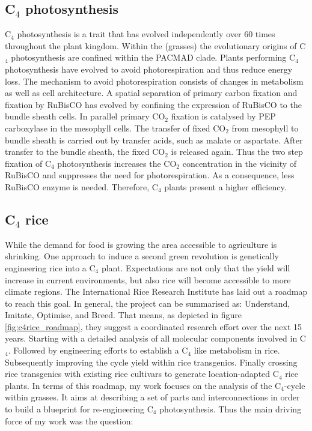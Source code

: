 \subsection{C$_4$ photosynthesis}
C$_4$ photosynthesis is a trait that has evolved independently over 60 times throughout the plant kingdom.
Within the  (grasses) the evolutionary origins of C$_4$ photosynthesis are confined within the PACMAD clade.
Plants performing C$_4$ photosynthesis have evolved to avoid photorespiration and thus reduce energy loss.
The mechanism to avoid photorespiration consists of changes in metabolism as well as cell architecture.
A spatial separation of primary carbon fixation and fixation by \ac{RuBisCO} has evolved by confining the expression of \ac{RuBisCO} to the bundle sheath cells.
In parallel primary CO$_2$ fixation is catalysed by PEP carboxylase in the mesophyll cells.
The transfer of fixed CO$_2$ from mesophyll to bundle sheath is carried out by transfer acids, such as malate or aspartate.
After transfer to the bundle sheath, the fixed CO$_2$ is released again.
Thus the two step fixation of C$_4$ photosynthesis increases the CO$_2$ concentration in the vicinity of \ac{RuBisCO} and suppresses the need for photorespiration.
As a consequence, less \ac{RuBisCO} enzyme is needed.
Therefore, C$_4$ plants present a higher efficiency.
\subsection{C$_4$ rice}
While the demand for food is growing the area accessible to agriculture is shrinking.
One approach to induce a second green revolution is genetically engineering rice into a C$_4$ plant.
Expectations are not only that the yield will increase in current environments, but also rice will become accessible to more climate regions.
The International Rice Research Institute has laid out a roadmap to reach this goal.
In general, the project can be summarised as: Understand, Imitate, Optimise, and Breed.
That means, as depicted in figure \ref{fig:c4rice_roadmap}, they suggest a coordinated research effort over the next 15 years.
Starting with a detailed analysis of all molecular components involved in C$_4$.
Followed by engineering efforts to establish a C$_4$ like metabolism in rice.
Subsequently improving the cycle yield within rice transgenics.
Finally crossing rice transgenics with existing rice cultivars to generate location-adapted C$_4$ rice plants.
In terms of this roadmap, my work focuses on the analysis of the C$_4$-cycle within grasses.
It aims at describing a set of parts and interconnections in order to build a blueprint for re-engineering C$_4$ photosynthesis.
Thus the main driving force of my work was the question: 

